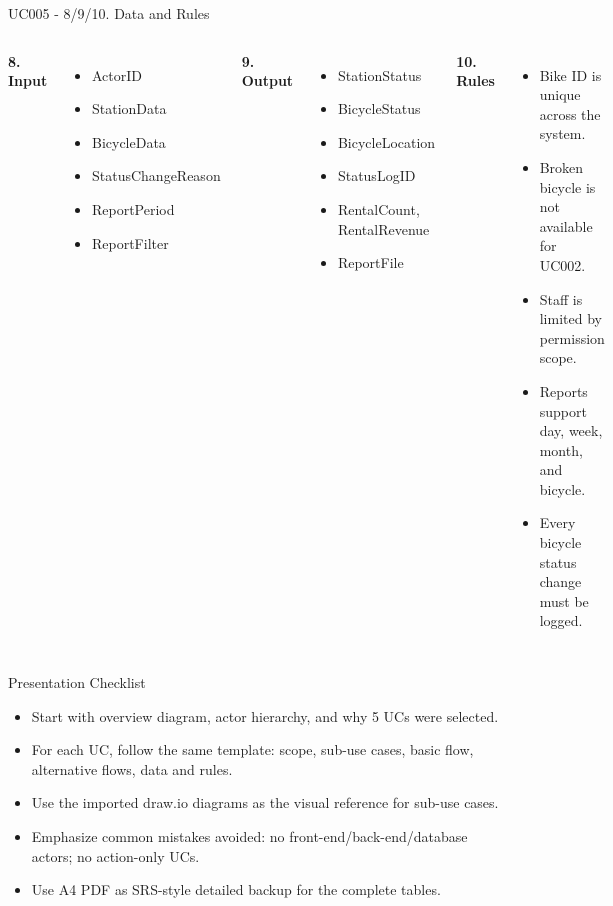 \documentclass[aspectratio=169,10pt]{beamer}
\newcommand{\tightitems}{\setlength{\itemsep}{2pt}\setlength{\parskip}{0pt}}
\begin{document}
\begin{frame}{UC005 - 8/9/10. Data and Rules}
\footnotesize
\begin{columns}[T,onlytextwidth]
\textbf{8. Input}
\begin{itemize}\tightitems
  \item ActorID
  \item StationData
  \item BicycleData
  \item StatusChangeReason
  \item ReportPeriod
  \item ReportFilter
\end{itemize}
\textbf{9. Output}
\begin{itemize}\tightitems
  \item StationStatus
  \item BicycleStatus
  \item BicycleLocation
  \item StatusLogID
  \item RentalCount, RentalRevenue
  \item ReportFile
\end{itemize}
\textbf{10. Rules}
\begin{itemize}\tightitems
  \item Bike ID is unique across the system.
  \item Broken bicycle is not available for UC002.
  \item Staff is limited by permission scope.
  \item Reports support day, week, month, and bicycle.
  \item Every bicycle status change must be logged.
\end{itemize}
\end{columns}
\end{frame}

\begin{frame}{Presentation Checklist}
\small
\begin{itemize}\tightitems
  \item Start with overview diagram, actor hierarchy, and why 5 UCs were selected.
  \item For each UC, follow the same template: scope, sub-use cases, basic flow, alternative flows, data and rules.
  \item Use the imported draw.io diagrams as the visual reference for sub-use cases.
  \item Emphasize common mistakes avoided: no front-end/back-end/database actors; no action-only UCs.
  \item Use A4 PDF as SRS-style detailed backup for the complete tables.
\end{itemize}
\end{frame}
\end{document}
